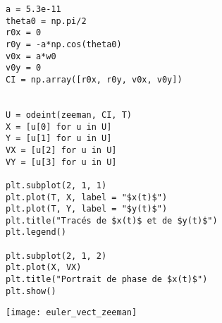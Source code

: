 \begin{minipage}{0.6\linewidth}
\begin{Answer}
\begin{lstlisting}
a = 5.3e-11
theta0 = np.pi/2
r0x = 0
r0y = -a*np.cos(theta0)
v0x = a*w0
v0y = 0
CI = np.array([r0x, r0y, v0x, v0y])


U = odeint(zeeman, CI, T)
X = [u[0] for u in U]
Y = [u[1] for u in U]
VX = [u[2] for u in U]
VY = [u[3] for u in U]

plt.subplot(2, 1, 1)
plt.plot(T, X, label = "$x(t)$")
plt.plot(T, Y, label = "$y(t)$")
plt.title("Tracés de $x(t)$ et de $y(t)$")
plt.legend()

plt.subplot(2, 1, 2)
plt.plot(X, VX)
plt.title("Portrait de phase de $x(t)$")
plt.show()
\end{lstlisting}
\end{Answer}
\end{minipage}
\begin{minipage}{0.45\linewidth}
\begin{center}
\texttt{[image: euler\_vect\_zeeman]}    
\end{center}
\end{minipage}
\newpage
